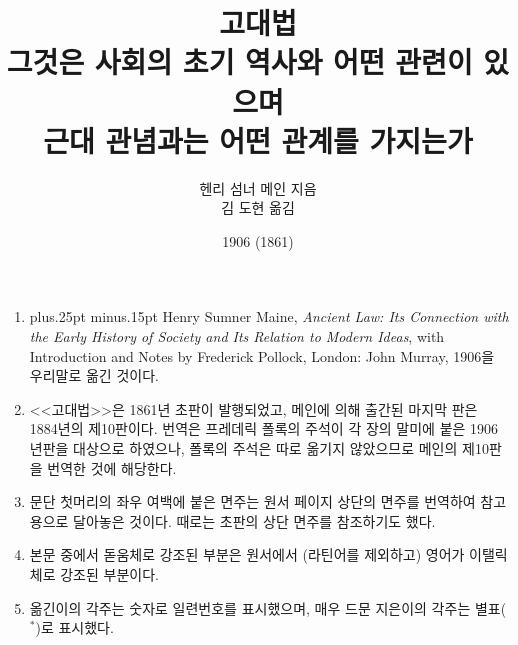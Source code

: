\documentclass[b5paper]{book}
\def\latinmarks{\hangulpunctuations=0
    \aftergroup\hangulpunctuations\aftergroup1\aftergroup\relax }
\def\latin#1{\ifnum\lastskip=0 \penalty50 \hskip0pt plus.25pt minus.15pt\fi
  \begingroup\latinmarks\footnotesize #1\endgroup}
\def\paren#1{\begingroup\small(#1)\endgroup}
\begin{document}
\title{고대법\\
\large 그것은 사회의 초기 역사와 어떤 관련이 있으며\\
근대 관념과는 어떤 관계를 가지는가}
\author{헨리 섬너 메인 지음\\
김 도현 옮김}
\date{1906 (1861)}

\frontmatter

\maketitle

\null\vfill
\thispagestyle{empty}
\begin{enumerate}
    \small
  \item \latin{\small
    Henry Sumner Maine, \textit{Ancient Law: Its Connection with
    the Early History of Society and Its Relation to Modern Ideas}, with
    Introduction and Notes by Frederick Pollock, London: John Murray,
    1906}을 우리말로 옮긴 것이다.
  \item <<고대법>>은 1861년 초판이 발행되었고,
    메인에 의해 출간된 마지막 판은 1884년의 제10판이다.
    번역은 프레데릭 폴록의 주석이
    각 장의 말미에 붙은 1906년판을 대상으로 하였으나,
    폴록의 주석은 따로 옮기지 않았으므로
    메인의 제10판을 번역한 것에 해당한다.
  \item 문단 첫머리의 좌우 여백에 붙은 면주는 원서 페이지 상단의 면주를
    번역하여
    참고용으로
    달아놓은 것이다.
    때로는 초판의 상단 면주를 참조하기도 했다.
  \item 본문 중에서 돋움체로 강조된 부분은
    원서에서 \paren{라틴어를 제외하고} 영어가
    이탤릭체로 강조된 부분이다.
  \item 옮긴이의 각주는 숫자로 일련번호를 표시했으며,
    매우 드문 지은이의 각주는 별표($^*$)로 표시했다.
\end{enumerate}

\begingroup
\linespread{1.25}
\tableofcontents
\endgroup






\mainmatter












\backmatter

\def\seename{$\rightarrow$}
\let\alsoname\seename
\raggedright
\printindex
\end{document}
